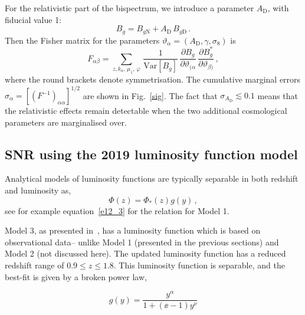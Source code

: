 For the relativistic part of the bispectrum, we introduce a parameter  $A_{\mathrm{D}}$, with fiducial value 1: 
\begin{equation}
B_g=B_{g\mathrm{N}}+A_{\mathrm{D}}\,B_{g\mathrm{D}} \,.
\end{equation}
Then the Fisher matrix for the parameters  $\vartheta_\alpha=(A_{\mathrm{D}},\gamma,\sigma_8)$ is
\begin{equation}
F_{\alpha\beta} = 
\sum_{z,k_a,\,\mu_{1},\,\varphi}\,\frac{1}{{\mathrm{Var}} [{B_{g}}]}
\,\frac{\partial B_{g}}{\partial \vartheta_{(\alpha}}\,\frac{\partial B^*_{g}}{\partial \vartheta_{\beta)}}\,,\label{fm}
\end{equation} 
where the round brackets denote symmetrisation. The cumulative marginal errors $\sigma_\alpha = [(F^{-1})_{\alpha\alpha}]^{1/2}$  are shown in Fig.~\ref{sig}. The fact that $\sigma_{A_{\mathrm{D}}}\lesssim 0.1$  means that the relativistic effects remain detectable when the two additional cosmological parameters are marginalised over.
%

\subsection{SNR using the 2019 luminosity function model}\label{ssec:snrmodel3}

Analytical models of luminosity functions are typically separable in both redshift and luminosity as, 
\begin{equation}
    \Phi(z) = \Phi_*(z) g(y)\,,
\end{equation}
see for example equation~\eqref{e12_3} for the relation for Model 1. 

Model 3, as presented in~\cite{Pozzetti:2016cch}, has a luminosity function which is based on observational data-- unlike Model 1 (presented in the previous sections) and Model 2 (not discussed here). The updated luminosity function has a reduced redshift range of $0.9 \leq z \leq 1.8$. This luminosity function is separable, and the best-fit is given by a broken power law, 

\begin{equation}
    g(y) = \frac{y^\alpha}{1 + (\ee - 1)y^\nu}
\end{equation}

